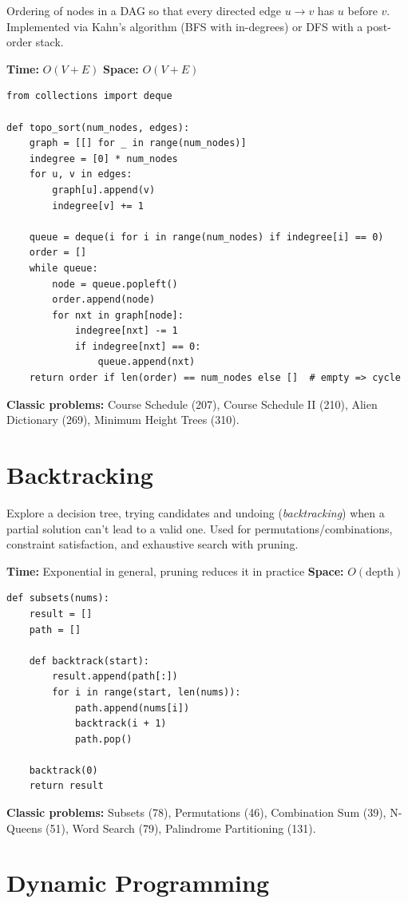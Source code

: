 \documentclass[11pt]{article}
\newcommand{\complexity}[2]{\textbf{Time:} #1 \quad \textbf{Space:} #2}
\begin{document}
Ordering of nodes in a DAG so that every directed edge $u \to v$ has $u$
before $v$. Implemented via Kahn's algorithm (BFS with in-degrees) or DFS
with a post-order stack.

\complexity{$O(V + E)$}{$O(V + E)$}

\begin{lstlisting}
from collections import deque

def topo_sort(num_nodes, edges):
    graph = [[] for _ in range(num_nodes)]
    indegree = [0] * num_nodes
    for u, v in edges:
        graph[u].append(v)
        indegree[v] += 1

    queue = deque(i for i in range(num_nodes) if indegree[i] == 0)
    order = []
    while queue:
        node = queue.popleft()
        order.append(node)
        for nxt in graph[node]:
            indegree[nxt] -= 1
            if indegree[nxt] == 0:
                queue.append(nxt)
    return order if len(order) == num_nodes else []  # empty => cycle
\end{lstlisting}

\textbf{Classic problems:} Course Schedule (207), Course Schedule II
(210), Alien Dictionary (269), Minimum Height Trees (310).

\section{Backtracking}

Explore a decision tree, trying candidates and undoing (\emph{backtracking})
when a partial solution can't lead to a valid one. Used for
permutations/combinations, constraint satisfaction, and exhaustive search
with pruning.

\complexity{Exponential in general, pruning reduces it in practice}{$O(\text{depth})$}

\begin{lstlisting}
def subsets(nums):
    result = []
    path = []

    def backtrack(start):
        result.append(path[:])
        for i in range(start, len(nums)):
            path.append(nums[i])
            backtrack(i + 1)
            path.pop()

    backtrack(0)
    return result
\end{lstlisting}

\textbf{Classic problems:} Subsets (78), Permutations (46), Combination
Sum (39), N-Queens (51), Word Search (79), Palindrome Partitioning (131).

\section{Dynamic Programming}
\end{document}
